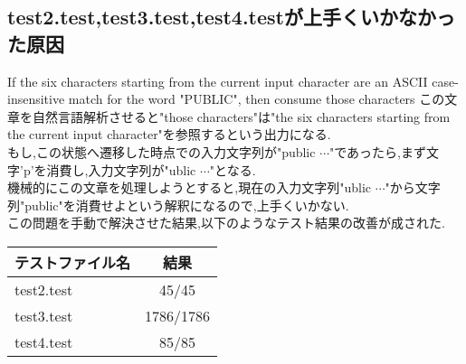 \documentclass[uplatex,a4j]{jsreport}
\begin{document}
\subsection*{test2.test,test3.test,test4.testが上手くいかなかった原因}
If the six characters starting from the current input character are an ASCII case-insensitive match for the word "PUBLIC", then consume those characters
この文章を自然言語解析させると"those characters"は"the six characters starting from the current input character"を参照するという出力になる.\\
もし,この状態へ遷移した時点での入力文字列が"public $\cdots$"であったら,まず文字'p'を消費し,入力文字列が"ublic $\cdots$"となる.\\
機械的にこの文章を処理しようとすると,現在の入力文字列"ublic $\cdots$"から文字列"public"を消費せよという解釈になるので,上手くいかない.\\
この問題を手動で解決させた結果,以下のようなテスト結果の改善が成された.\\
\begin{table}[htb]
    \begin{tabular}{|l|c|} \hline
      テストファイル名 & 結果 \\ \hline 
      test2.test & 45/45 \\
      test3.test & 1786/1786 \\
      test4.test & 85/85 \\ \hline 
    \end{tabular}
\end{table}
\end{document}
